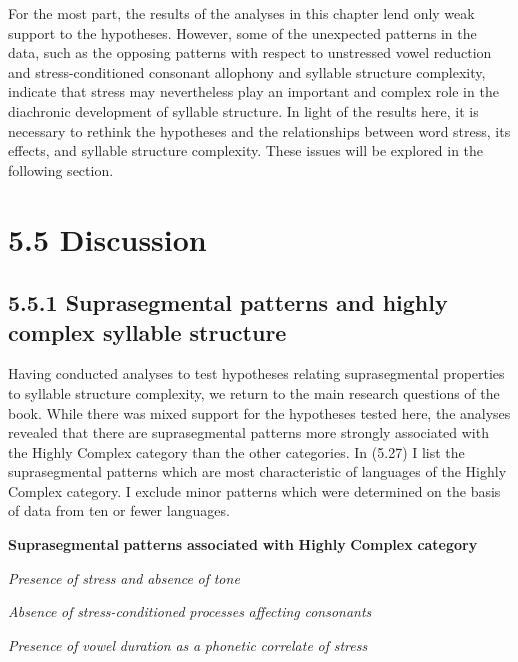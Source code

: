   For the most part, the results of the analyses in this chapter lend only weak support to the hypotheses. However, some of the unexpected patterns in the data, such as the opposing patterns with respect to unstressed vowel reduction and stress-conditioned consonant allophony and syllable structure complexity, indicate that stress may nevertheless play an important and complex role in the diachronic development of syllable structure. In light of the results here, it is necessary to rethink the hypotheses and the relationships between word stress, its effects, and syllable structure complexity. These issues will be explored in the following section.


\section{5.5 Discussion}
\subsection{5.5.1 Suprasegmental patterns and highly complex syllable structure}

  Having conducted analyses to test hypotheses relating suprasegmental properties to syllable structure complexity, we return to the main research questions of the book. While there was mixed support for the hypotheses tested here, the analyses revealed that there are suprasegmental patterns more strongly associated with the Highly Complex category than the other categories. In (5.27) I list the suprasegmental patterns which are most characteristic of languages of the Highly Complex category. I exclude minor patterns which were determined on the basis of data from ten or fewer languages.



\ea\label{ex:(5.27)}
  \textbf{Suprasegmental} \textbf{patterns} \textbf{associated} \textbf{with} \textbf{Highly} \textbf{Complex} \textbf{category}



\textit{Presence} \textit{of} \textit{stress} \textit{and} \textit{absence} \textit{of} \textit{tone}



\textit{Absence} \textit{of} \textit{stress-conditioned} \textit{processes} \textit{affecting} \textit{consonants}



\textit{Presence} \textit{of} \textit{vowel} \textit{duration} \textit{as} \textit{a} \textit{phonetic} \textit{correlate} \textit{of} \textit{stress}
\z



